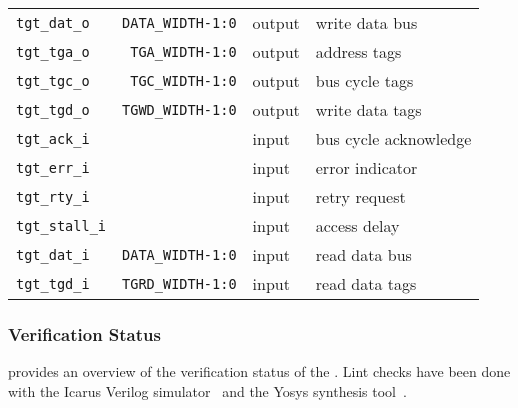 \begin{center}
\begin{longtable}{|l|r|l|l|}
    \texttt{tgt\_dat\_o}         & \texttt{DATA\_WIDTH-1:0} & output & write data bus            \\
    \texttt{tgt\_tga\_o}         & \texttt{TGA\_WIDTH-1:0}  & output & address tags              \\
    \texttt{tgt\_tgc\_o}         & \texttt{TGC\_WIDTH-1:0}  & output & bus cycle tags            \\
    \texttt{tgt\_tgd\_o}         & \texttt{TGWD\_WIDTH-1:0} & output & write data tags           \\
    \texttt{tgt\_ack\_i}         &                          & input  & bus cycle acknowledge     \\
    \texttt{tgt\_err\_i}         &                          & input  & error indicator           \\
    \texttt{tgt\_rty\_i}         &                          & input  & retry request             \\
    \texttt{tgt\_stall\_i}       &                          & input  & access delay              \\
    \texttt{tgt\_dat\_i}         & \texttt{DATA\_WIDTH-1:0} & input  & read data bus             \\
    \texttt{tgt\_tgd\_i}         & \texttt{TGRD\_WIDTH-1:0} & input  & read data tags            \\   
  \end{longtable}
\end{center}  

\subsubsection{Verification Status}
\label{pipe:verif}

 provides an overview of the verification status of the .
Lint checks have been done with the Icarus Verilog simulator~\cite{iverilog} and the Yosys synthesis tool~\cite{yosys}.

